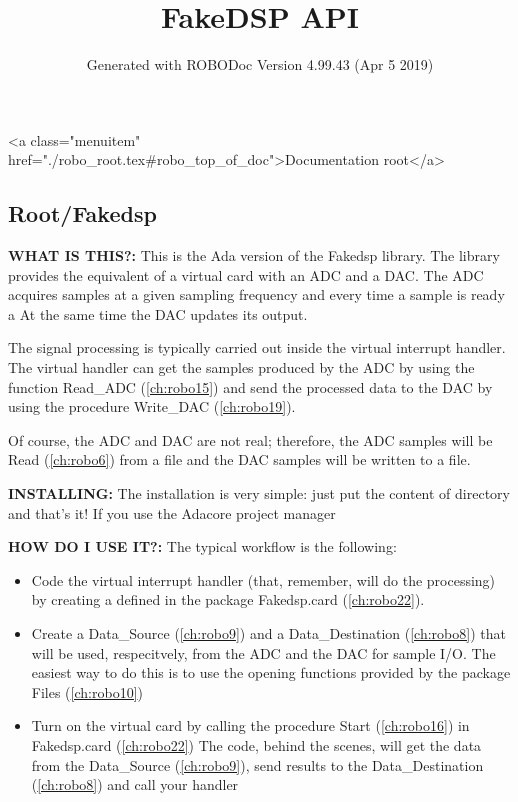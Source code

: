 \documentclass{article}
\title{FakeDSP API}
\author{Generated with ROBODoc Version 4.99.43 (Apr  5 2019)
}
\begin{document}
\maketitle
\printindex
\tableofcontents
\newpage

<a class="menuitem" href="./robo_root.tex#robo_top_of_doc">Documentation root</a>\subsection{Root/Fakedsp}
\textbf{WHAT IS THIS?:}\hspace{0.08in}
   This is the Ada version of the Fakedsp library. The library provides
   the equivalent of a virtual card with an ADC and a DAC.  The ADC
   acquires samples at a given sampling frequency and every time 
   a sample is ready a 
   At the same time the DAC updates its output.



   The signal processing is typically carried out inside the virtual
   interrupt handler.  The virtual handler can get the samples 
   produced by the ADC by using the function Read\_ADC (\ref{ch:robo15}) and send the 
   processed data to the DAC by using the procedure Write\_DAC (\ref{ch:robo19}).



   Of course, the ADC and DAC are not real; therefore, the ADC samples
   will be Read (\ref{ch:robo6}) from a file and the DAC samples will be written to
   a file.

\textbf{INSTALLING:}\hspace{0.08in}
    The installation is very simple: just put the content of directory 
    and that's it!  If you use the Adacore project manager

\textbf{HOW DO I USE IT?:}\hspace{0.08in}
  The typical workflow is the following:

\begin{itemize}
  \item   Code the virtual interrupt handler (that, remember, will do the 
    processing) by creating a 
    defined in the package Fakedsp.card (\ref{ch:robo22}).
  \item   Create a Data\_Source (\ref{ch:robo9}) and a Data\_Destination (\ref{ch:robo8}) that will be used, 
    respecitvely, from the ADC and the DAC for sample I/O.  The easiest
    way to do this is to use the opening functions provided by 
    the package Files (\ref{ch:robo10})
  \item   Turn on the virtual card by calling the procedure Start (\ref{ch:robo16}) in 
    Fakedsp.card (\ref{ch:robo22})  The code, behind the scenes,  will get the data
    from the Data\_Source (\ref{ch:robo9}), send results to the Data\_Destination (\ref{ch:robo8}) and call
    your handler
\end{itemize}
\end{document}
